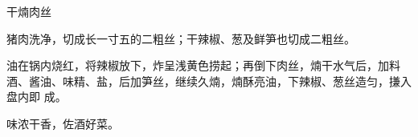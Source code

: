 %
%
%
%
%
%
%
\begin{recipe}{干煵肉丝}

\ingredients


\preparation

\step 猪肉洗净，切成长一寸五的二粗丝；干辣椒、葱及鲜笋也切成二粗丝。

\step 油在锅内烧红，将辣椒放下，炸呈浅黄色捞起；再倒下肉丝，煵干水气后，加料
酒、酱油、味精、盐，后加笋丝，继续久煵，煵酥亮油，下辣椒、葱丝造匀，搛入盘内即
成。

\features

味浓干香，佐酒好菜。

\end{recipe}

